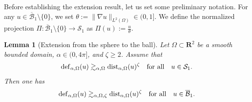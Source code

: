 \documentclass[reqno,11pt]{amsart}
\newtheorem{lemma}[theorem]{Lemma}
\theoremstyle{definition}
\begin{document}
Before establishing the extension result, let us set some preliminary notation.
For any $u\in\overline{\mathcal{B}}_1\setminus\{0\}$, we set 
$\theta:=\|\nabla u\|_{L^2(\Omega)}\in(0,1]$.
We define the normalized projection $\Pi:\overline{\mathcal{B}}_1\setminus\{0\}\to \mathcal{S}_1$ as 
\(\Pi(u):=\frac{u}{\theta}\).

\begin{lemma}[Extension from the sphere to the ball]
\label{lm:sphere_to_ball}
Let $\Omega\subset\mathbf{R}^2$ be a smooth bounded domain, $\alpha\in(0,4\pi]$, and $\zeta\geq 2$.
Assume that
\begin{equation}\label{eq:stability_sphere}
{\rm def}_{\alpha, \Omega} (u) \gtrsim_{\alpha, \Omega} {\rm dist}_{\alpha, \Omega}(u)^\zeta
\quad {\rm for \ all}\quad u\in \mathcal{S}_1.
\end{equation}
Then one has
\begin{equation}\label{eq:stability_ball}
{\rm def}_{\alpha,\Omega}(u)\gtrsim_{\alpha,\Omega,\zeta}{\rm dist}_{\alpha,\Omega}(u)^\zeta \quad {\rm for \ all} \quad u\in  \overline{\mathcal{B}}_1.
\end{equation}
\end{lemma}
\end{document}

